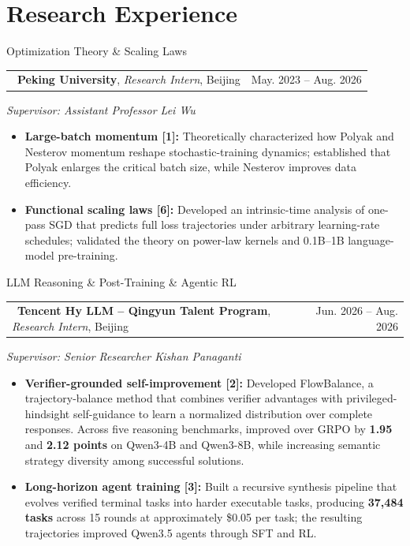 \documentclass[a4paper,9pt]{extarticle}
\makeatletter
\newcommand{\datedentry}[2]{%
\begin{tabularx}{\linewidth}{@{}X r@{}}
#1 & #2
\end{tabularx}}
\makeatother
\begin{document}
\section{Research Experience}
\noindent\textsf{Optimization Theory \& Scaling Laws}\par
\vspace{-2pt}
\datedentry{\faCaretRight\ \textcolor{experienceblue}{\textbf{Peking University}}, \textit{Research Intern}, Beijing}{May. 2023 -- Aug. 2026}
\vspace{-3pt}
\hspace{1em}\textit{Supervisor: Assistant Professor Lei Wu}
\begin{itemize}\setlength\itemsep{1pt}\setlength\topsep{2pt}\setlength\parsep{0pt}\setlength\parskip{0pt}\small
  \item \textbf{Large-batch momentum [1]:} Theoretically characterized how Polyak and Nesterov momentum reshape stochastic-training dynamics; established that Polyak enlarges the critical batch size, while Nesterov improves data efficiency.
  \item \textbf{Functional scaling laws [6]:} Developed an intrinsic-time analysis of one-pass SGD that predicts full loss trajectories under arbitrary learning-rate schedules; validated the theory on power-law kernels and 0.1B--1B language-model pre-training.
\end{itemize}
\vspace{-3pt}

\noindent\textsf{LLM Reasoning \& Post-Training \& Agentic RL}\par
\vspace{-2pt}
\datedentry{\faCaretRight\ \textcolor{experienceblue}{\textbf{Tencent Hy LLM -- Qingyun Talent Program}}, \textit{Research Intern}, Beijing}{Jun. 2026 -- Aug. 2026}
\vspace{-3pt}
\hspace{1em}\textit{Supervisor: Senior Researcher Kishan Panaganti}
\begin{itemize}\setlength\itemsep{1pt}\setlength\topsep{2pt}\setlength\parsep{0pt}\setlength\parskip{0pt}\small
  \item \textbf{Verifier-grounded self-improvement [2]:} Developed FlowBalance, a trajectory-balance method that combines verifier advantages with privileged-hindsight self-guidance to learn a normalized distribution over complete responses. Across five reasoning benchmarks, improved over GRPO by \textbf{1.95} and \textbf{2.12 points} on Qwen3-4B and Qwen3-8B, while increasing semantic strategy diversity among successful solutions.
  \item \textbf{Long-horizon agent training [3]:} Built a recursive synthesis pipeline that evolves verified terminal tasks into harder executable tasks, producing \textbf{37,484 tasks} across 15 rounds at approximately \$0.05 per task; the resulting trajectories improved Qwen3.5 agents through SFT and RL.
\end{itemize}
\vspace{-3pt}
\end{document}
